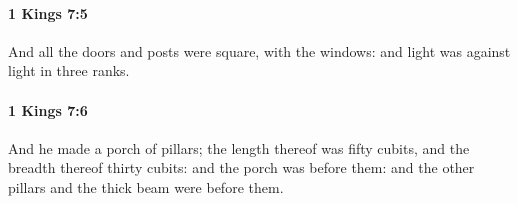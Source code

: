 		\paragraph{1 Kings 7:5} %
			\label{1KINGS-7-5}

			And all the doors and posts were square, with the windows: and light was against light in three ranks.


		\paragraph{1 Kings 7:6} %
			\label{1KINGS-7-6}

			And he made a porch of pillars; the length thereof was fifty cubits, and the breadth thereof thirty cubits: and the porch was before them: and the other pillars and the thick beam were before them.



